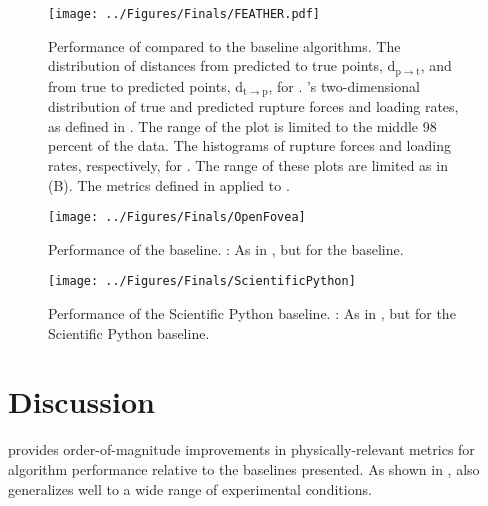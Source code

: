\begin{figure}[htpb]
\caption[\name{} performance]{\noindent{}Performance of \name{} compared to the baseline algorithms.  The distribution of distances from predicted to true points, d$_{\mathrm{p}\rightarrow\mathrm{t}}$, and from true to predicted points, d$_{\mathrm{t}\rightarrow\mathrm{p}}$, for \name{}.  \name{}'s two-dimensional distribution of true and predicted rupture forces and loading rates, as defined in . The range of the plot is limited to the middle 98 percent of the data.  The histograms of rupture forces and loading rates, respectively, for \name{}. The range of these plots are limited as in (B).  The metrics defined in  applied to \name{}. }
\centering
\texttt{[image: ../Figures/Finals/FEATHER.pdf]}%
\end{figure}

\begin{figure}[htpb]
\caption[\OpenFovea{} performance]{\noindent{}Performance of the \OpenFovea{} baseline. : As in , but for the \OpenFovea{} baseline.}
\centering
\texttt{[image: ../Figures/Finals/OpenFovea]}%
\end{figure}



\begin{figure}[htpb]
\caption[Scientific Python performance]{\noindent{}Performance of the Scientific Python baseline. : As in , but for the Scientific Python baseline. }
\centering
\texttt{[image: ../Figures/Finals/ScientificPython]}%
\end{figure}


\chapter{Discussion}


 \name{} provides order-of-magnitude improvements in physically-relevant metrics for algorithm performance relative to the baselines presented. As shown in , \name{} also generalizes well to a wide range of \singlemol{} experimental conditions.  

